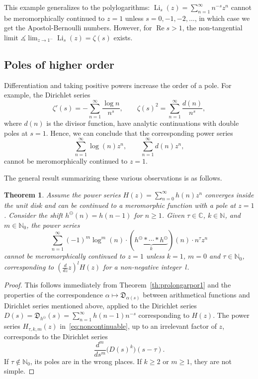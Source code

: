 \documentclass[11pt,a4paper]{amsart}
\newcommand{\N}{\mathbb{N}}
\newcommand{\C}{\mathbb{C}}
\renewcommand{\Re}{\operatorname{Re}}
\newcommand{\Li}{\operatorname{Li}}
\newcommand{\D}{\mathfrak{D}}
\newcommand{\decr}{\ominus}
\theoremstyle{plain}
\newtheorem{theorem}{Theorem}
\theoremstyle{plain}
\theoremstyle{plain}
\theoremstyle{definition}
\theoremstyle{remark}
\begin{document}
This example generalizes to the polylogarithms: $\Li_{s}(z) = \sum_{n=1}^{\infty} n^{-s} z^{n}$ cannot be meromorphically continued to $z=1$ unless $s=0,-1,-2,\dots$, in which case we get the Apostol-Bernoulli numbers. However, for $\Re s > 1$, the non-tangential limit $\measuredangle\lim_{z \to 1^{-}} \Li_{s}(z) = \zeta(s)$ exists.


\subsection{Poles of higher order}
\label{subsec:poles_higher}

Differentiation and taking positive powers increase the order of a pole. For example, the Dirichlet series
\begin{equation*}
  \zeta'(s)  = -\sum_{n=1}^{\infty} \frac{\log n}{n^s},
  \qquad
  \zeta(s)^2 = \sum_{n=1}^{\infty} \frac{d(n)}{n^s},
\end{equation*}
where $d(n)$ is the divisor function, have analytic continuations with double poles at $s=1$. Hence, we can conclude that the corresponding power series
\[
  \sum_{n=1}^{\infty} \log(n) z^{n},
  \qquad
  \sum_{n=1}^{\infty} d(n) z^{n},
\]
cannot be meromorphically continued to $z=1$.

The general result summarizing these various observations is as follows.

\begin{theorem}
\label{th:noncontinuable}
Assume the power series $H(z) = \sum_{n=0}^{\infty} h(n) z^{n}$ converges inside the  unit disk and can be continued to a meromorphic function with a pole at $z=1$. Consider the shift $h^{\decr}(n) = h(n-1)$ for $n \geq 1$. Given $\tau \in \C$, $k \in \N$, and $m \in \N_{0}$, the power series
\begin{equation}
\label{eq:noncontinuable}
  \sum_{n=1}^{\infty} (-1)^{m} \log^{m}(n) 
  \cdot ( \underbrace{h^{\decr} * \cdots * h^{\decr}}_{k})(n) \cdot n^{\tau} z^{n}
\end{equation}
cannot be meromorphically continued to $z=1$ unless $k=1$, $m=0$ and $\tau \in \N_{0}$, corresponding to $\left(\frac{d}{dz} z\right)^{l} H(z)$ for a non-negative integer~$l$.
\end{theorem}


\begin{proof}
This follows immediately from Theorem~\ref{th:prolongarpor1} and the properties of the correspondence $\alpha \mapsto \D_{\alpha(s)}$ between arithmetical functions and Dirichlet series mentioned above, applied to the Dirichlet series $D(s) = \D_{h^{\decr}}(s) = \sum_{n=1}^{\infty} h(n-1) n^{-s}$ corresponding to $H(z)$. The power series $H_{\tau,k,m}(z)$ in~\eqref{eq:noncontinuable}, up to an irrelevant factor of $z$, corresponds to the Dirichlet series
\[
  \frac{d^m}{ds^m}\bigl(D(s)^k\bigr)(s-\tau).
\]
If $\tau \notin \N_{0}$, its poles are in the wrong places. If $k \geq 2$ or $m \geq 1$, they are not simple.
\end{proof}
\end{document}

